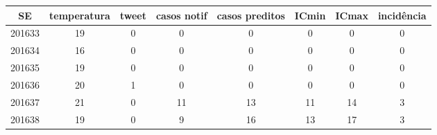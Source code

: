 \begin{tabular}{c|ccccccc}
  \hline
SE & temperatura & tweet & casos notif & casos preditos & ICmin & ICmax & incidência \\ 
  \hline
201633 & 19 & 0 & 0 & 0 & 0 & 0 & 0 \\ 
  201634 & 16 & 0 & 0 & 0 & 0 & 0 & 0 \\ 
  201635 & 19 & 0 & 0 & 0 & 0 & 0 & 0 \\ 
  201636 & 20 & 1 & 0 & 0 & 0 & 0 & 0 \\ 
  201637 & 21 & 0 & 11 & 13 & 11 & 14 & 3 \\ 
  201638 & 19 & 0 & 9 & 16 & 13 & 17 & 3 \\ 
   \hline
\end{tabular}
